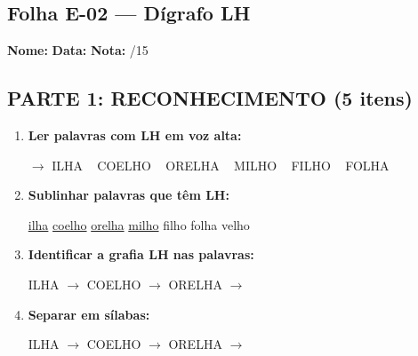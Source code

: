 \subsection{Folha E-02 --- Dígrafo LH}
\begin{exercicio}



\noindent\textbf{Nome:} \underline{\hspace{3.2cm}} \quad \textbf{Data:} \underline{\hspace{1.6cm}} \quad \textbf{Nota:} \underline{\hspace{0.9cm}}/15


\subsection*{PARTE 1: RECONHECIMENTO (5 itens)}

\begin{enumerate}

  \item \textbf{Ler palavras com LH em voz alta:}
  \begin{center}
  $\rightarrow$ ILHA ~ COELHO ~ ORELHA ~ MILHO ~ FILHO ~ FOLHA
  \end{center}

  \item \textbf{Sublinhar palavras que têm LH:}

\begin{center}
  \uline{ilha} \quad \uline{coelho} \quad \uline{orelha} \quad \uline{milho} \quad filho \quad folha \quad velho
\end{center}

  \item \textbf{Identificar a grafia LH nas palavras:}
  \begin{center}
  ILHA $\rightarrow$ \underline{\hspace{1cm}} \quad COELHO $\rightarrow$ \underline{\hspace{1cm}} \quad ORELHA $\rightarrow$ \underline{\hspace{1cm}}
  \end{center}

  \item \textbf{Separar em sílabas:}
  \begin{center}
  ILHA $\rightarrow$ \underline{\hspace{1.2cm}} \quad COELHO $\rightarrow$ \underline{\hspace{1.2cm}} \quad ORELHA $\rightarrow$ \underline{\hspace{1.2cm}}
  \end{center}


\end{enumerate}
\end{exercicio}
